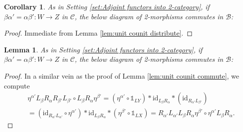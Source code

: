 \documentclass{article}
\newcommand{\id}{\mathrm{id}}
\newcommand{\fB}{\mathscr{B}}
\newcommand{\fC}{\mathscr{C}}
\newcommand{\altid}{\mathds{1}}
\newtheorem{corollary}{Corollary}[theorem]
\newtheorem{lemma}[theorem]{Lemma}
\begin{document}
    \begin{corollary}\label{cor:swap counits}
        As in Setting \ref{set:Adjoint functors into 2-category}, if $\beta \alpha' = \alpha \beta':W\to Z$ in $\fC$, the below diagram of 2-morphisms commutes in $\fB$:
        \begin{center}
        \end{center}
\end{corollary}
\begin{proof}
Immediate from Lemma \ref{lem:unit counit distribute}.
\end{proof}
\begin{lemma}\label{lem:unit counit distribute with identity in middle}
    As in Setting \ref{set:Adjoint functors into 2-category}, if $\beta \alpha' = \alpha \beta':W\to Z$ in $\fC$, the below diagram of 2-morphisms commutes in $\fB$:
        \begin{center}
        \end{center}
\end{lemma}
\begin{proof}
    In a similar vein as the proof of Lemma \ref{lem:unit counit commute}, we compute
    \begin{align*}
        &\eta^{\alpha'}L_\beta R_\alpha R_{\beta'}L_{\beta'}\circ L_{\beta} R_\alpha  \eta^{\beta'}=(\eta^{\alpha'}\circ \altid_{LY})*\id_{L_\beta R_\alpha}*(\id_{R_{\alpha'}L_{\beta'}})\\
        &=(\id_{R_{\alpha'}L_{\alpha'}}\circ \eta^{\alpha'})*\id_{L_\beta R_\alpha}*(\eta^{\beta'}\circ \altid_{LX})=R_{\alpha'}L_{\alpha'}L_\beta R_\alpha \eta^{\beta'}\circ \eta^{\alpha'}L_\beta R_\alpha.
    \end{align*}
\end{proof}
\end{document}
